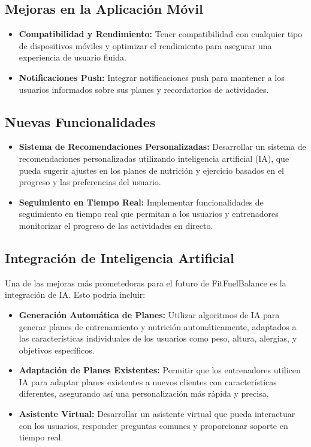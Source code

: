 \subsection{Mejoras en la Aplicación Móvil}
\begin{itemize}
    \item \textbf{Compatibilidad y Rendimiento:} Tener compatibilidad con cualquier tipo de dispositivos móviles y optimizar el rendimiento para asegurar una experiencia de usuario fluida.
    \item \textbf{Notificaciones Push:} Integrar notificaciones push para mantener a los usuarios informados sobre sus planes y recordatorios de actividades.
\end{itemize}

\subsection{Nuevas Funcionalidades}
\begin{itemize}
    \item \textbf{Sistema de Recomendaciones Personalizadas:} Desarrollar un sistema de recomendaciones personalizadas utilizando inteligencia artificial (IA), que pueda sugerir ajustes en los planes de nutrición y ejercicio basados en el progreso y las preferencias del usuario.
    \item \textbf{Seguimiento en Tiempo Real:} Implementar funcionalidades de seguimiento en tiempo real que permitan a los usuarios y entrenadores monitorizar el progreso de las actividades en directo.
\end{itemize}

\subsection{Integración de Inteligencia Artificial}
Una de las mejoras más prometedoras para el futuro de FitFuelBalance es la integración de IA. Esto podría incluir:
\begin{itemize}
    \item \textbf{Generación Automática de Planes:} Utilizar algoritmos de IA para generar planes de entrenamiento y nutrición automáticamente, adaptados a las características individuales de los usuarios como peso, altura, alergias, y objetivos específicos.
    \item \textbf{Adaptación de Planes Existentes:} Permitir que los entrenadores utilicen IA para adaptar planes existentes a nuevos clientes con características diferentes, asegurando así una personalización más rápida y precisa.
    \item \textbf{Asistente Virtual:} Desarrollar un asistente virtual que pueda interactuar con los usuarios, responder preguntas comunes y proporcionar soporte en tiempo real.
\end{itemize}